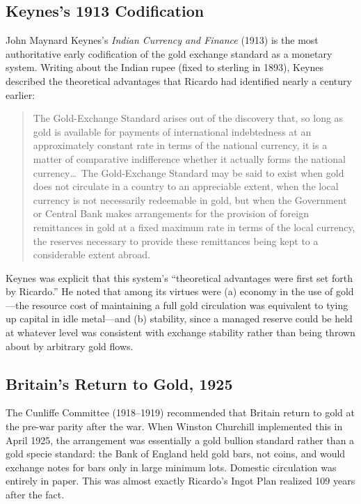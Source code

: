 \documentclass[12pt]{article}
\begin{document}
\subsection{Keynes's 1913 Codification}

John Maynard Keynes's \textit{Indian Currency and Finance} (1913)
is the most authoritative early codification of the gold exchange
standard as a monetary system.  Writing about the Indian rupee
(fixed to sterling in 1893), Keynes described the theoretical
advantages that Ricardo had identified nearly a century earlier:

\begin{quote}
The Gold-Exchange Standard arises out of the discovery that, so
long as gold is available for payments of international
indebtedness at an approximately constant rate in terms of the
national currency, it is a matter of comparative indifference
whether it actually forms the national currency\ldots\ The
Gold-Exchange Standard may be said to exist when gold does not
circulate in a country to an appreciable extent, when the local
currency is not necessarily redeemable in gold, but when the
Government or Central Bank makes arrangements for the provision
of foreign remittances in gold at a fixed maximum rate in terms
of the local currency, the reserves necessary to provide these
remittances being kept to a considerable extent abroad.
\citep[Ch.~II]{Keynes1913}
\end{quote}

Keynes was explicit that this system's ``theoretical advantages
were first set forth by Ricardo.''  He noted that among its
virtues were (a) economy in the use of gold---the resource cost
of maintaining a full gold circulation was equivalent to tying up
capital in idle metal---and (b) stability, since a managed reserve
could be held at whatever level was consistent with exchange
stability rather than being thrown about by arbitrary gold flows.

\subsection{Britain's Return to Gold, 1925}

The Cunliffe Committee (1918--1919) recommended that Britain
return to gold at the pre-war parity after the war.  When
Winston Churchill implemented this in April 1925, the arrangement
was essentially a gold bullion standard rather than a gold specie
standard: the Bank of England held gold bars, not coins, and
would exchange notes for bars only in large minimum lots.
Domestic circulation was entirely in paper.  This was almost
exactly Ricardo's Ingot Plan realized 109 years after the fact.
\end{document}
